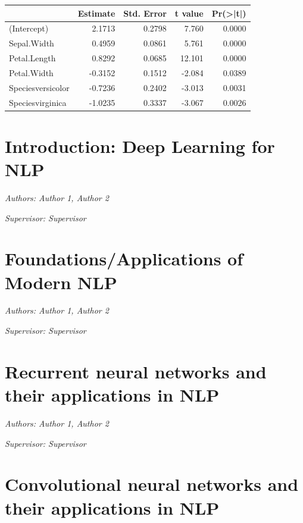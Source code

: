 \documentclass[]{krantz}
\begin{document}
\begin{tabular}{l|r|r|r|r}
\hline
  & Estimate & Std. Error & t value & Pr(>|t|)\\
\hline
(Intercept) & 2.1713 & 0.2798 & 7.760 & 0.0000\\
\hline
Sepal.Width & 0.4959 & 0.0861 & 5.761 & 0.0000\\
\hline
Petal.Length & 0.8292 & 0.0685 & 12.101 & 0.0000\\
\hline
Petal.Width & -0.3152 & 0.1512 & -2.084 & 0.0389\\
\hline
Speciesversicolor & -0.7236 & 0.2402 & -3.013 & 0.0031\\
\hline
Speciesvirginica & -1.0235 & 0.3337 & -3.067 & 0.0026\\
\hline
\end{tabular}

\hypertarget{introduction-deep-learning-for-nlp}{%
\chapter{Introduction: Deep Learning for NLP}\label{introduction-deep-learning-for-nlp}}

\emph{Authors: Author 1, Author 2}

\emph{Supervisor: Supervisor}

\hypertarget{foundationsapplications-of-modern-nlp}{%
\chapter{Foundations/Applications of Modern NLP}\label{foundationsapplications-of-modern-nlp}}

\emph{Authors: Author 1, Author 2}

\emph{Supervisor: Supervisor}

\hypertarget{recurrent-neural-networks-and-their-applications-in-nlp}{%
\chapter{Recurrent neural networks and their applications in NLP}\label{recurrent-neural-networks-and-their-applications-in-nlp}}

\emph{Authors: Author 1, Author 2}

\emph{Supervisor: Supervisor}

\hypertarget{convolutional-neural-networks-and-their-applications-in-nlp}{%
\chapter{Convolutional neural networks and their applications in NLP}\label{convolutional-neural-networks-and-their-applications-in-nlp}}
\end{document}
